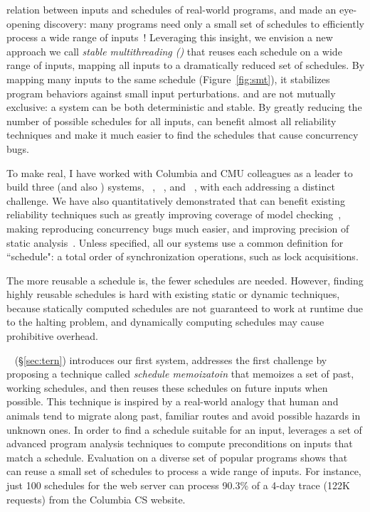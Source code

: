 relation between inputs and schedules of real-world programs, and made an
eye-opening discovery: many programs need only a small set of schedules to
efficiently process a wide range of inputs~\cite{smt:cacm}! Leveraging this
insight, we envision a new approach we call \emph{stable multithreading (\smt)}
that reuses each schedule on a wide range of inputs, mapping all inputs to a
dramatically reduced set of schedules. By mapping many inputs to the same
schedule (Figure~\ref{fig:smt}), it stabilizes program behaviors against small
input perturbations. \smt and \dmt are not mutually exclusive: a system can be
both deterministic and stable. By greatly reducing the number of possible
schedules for all inputs, \smt can benefit almost all reliability techniques and
make it much easier to find the schedules that cause concurrency bugs. 

To make \smt real, I have worked with Columbia and CMU colleagues as a leader to
build three \smt (and also \dmt) systems, \tern~\cite{cui:tern:osdi10},
\peregrine~\cite{peregrine:sosp11}, and \parrot~\cite{parrot:sosp13}, with each
addressing a distinct challenge. We have also quantitatively demonstrated that
\smt can benefit existing reliability techniques such as greatly improving
coverage of model checking~\cite{parrot:sosp13}, making reproducing concurrency
bugs much easier, and improving precision of static analysis~\cite{wu:pldi12}.
Unless specified, all our systems use a common definition for ``schedule": a
total order of synchronization operations, such as lock acquisitions.

 The more reusable a schedule is, the fewer schedules are needed.
However, finding highly reusable schedules is hard with existing static or
dynamic techniques, because statically computed schedules are not guaranteed to
work at runtime due to the halting problem, and dynamically computing schedules
may cause prohibitive overhead.

\tern~\cite{cui:tern:osdi10} (\S\ref{sec:tern}) introduces our first \smt
system, addresses the first challenge by proposing a technique called
\emph{schedule memoizatoin} that memoizes a set of past, working schedules, and
then 
reuses these schedules on future inputs when possible. This technique is
inspired
by a real-world analogy that human and animals tend to migrate along past,
familiar routes
and avoid possible hazards in unknown ones. In order to find a schedule 
suitable for an input, \tern leverages a set of advanced program 
analysis techniques to compute preconditions on inputs that match a schedule. 
Evaluation on a diverse set of popular programs shows that \tern can
reuse a small set of schedules to process a wide range of inputs. For 
instance, just 100 schedules for the \apache web server can process 90.3\% of a
4-day 
trace (122K requests) from the Columbia CS website.

